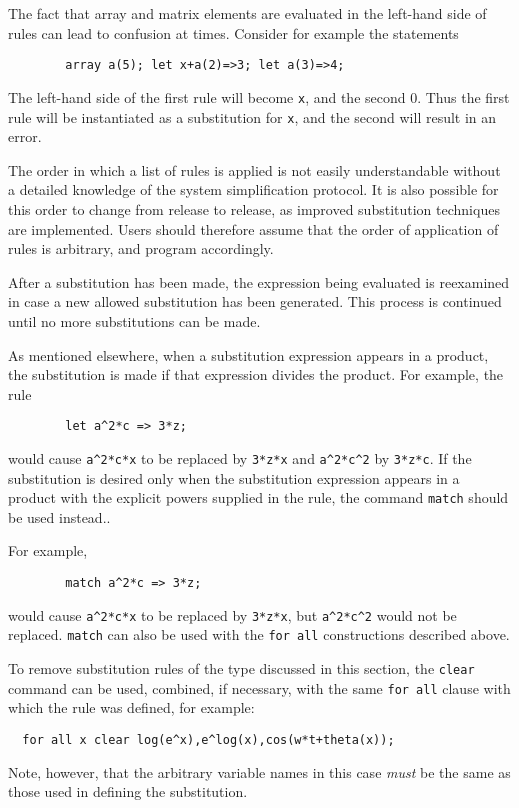 The fact that array and matrix elements are evaluated in the left-hand side
of rules can lead to confusion at times. Consider for example the
statements
\begin{verbatim}
        array a(5); let x+a(2)=>3; let a(3)=>4;
\end{verbatim}
The left-hand side of the first rule will become \texttt{x}, and the second
0.  Thus the first rule will be instantiated as a substitution for
\texttt{x}, and the second will result in an error.

The order in which a list of rules is applied is not easily understandable
without a detailed knowledge of the system simplification protocol. It is
also possible for this order to change from release to release, as improved
substitution techniques are implemented. Users should therefore assume
that the order of application of rules is arbitrary, and program
accordingly.

After a substitution has been made, the expression being evaluated is
reexamined in case a new allowed substitution has been generated. This
process is continued until no more substitutions can be made.

\hypertarget{command:MATCH}{}
As mentioned elsewhere, when a substitution expression appears in a
product, the substitution is made if that expression divides the product.
For example, the rule
\begin{verbatim}
        let a^2*c => 3*z;
\end{verbatim}
would cause \texttt{a\textasciicircum 2*c*x} to be replaced by \texttt{3*z*x} and
\texttt{a\textasciicircum 2*c\textasciicircum 2} by \texttt{3*z*c}.  If the substitution is desired only
when the substitution expression appears in a product with the explicit
powers supplied in the rule, the command \texttt{match} should be used
instead..

For example,
\begin{verbatim}
        match a^2*c => 3*z;
\end{verbatim}
would cause \texttt{a\textasciicircum 2*c*x} to be replaced by \texttt{3*z*x}, but
\texttt{a\textasciicircum 2*c\textasciicircum 2} would not be replaced. \texttt{match} can also be used
with the \texttt{for all} constructions described above.

To remove substitution rules of the type discussed in this section, the
\texttt{clear} command can be used, combined, if necessary,
with the same \texttt{for all} clause with which the rule was defined, for
example:
\begin{verbatim}
  for all x clear log(e^x),e^log(x),cos(w*t+theta(x));
\end{verbatim}
Note, however, that the arbitrary variable names in this case \emph{must}
be the same as those used in defining the substitution.

